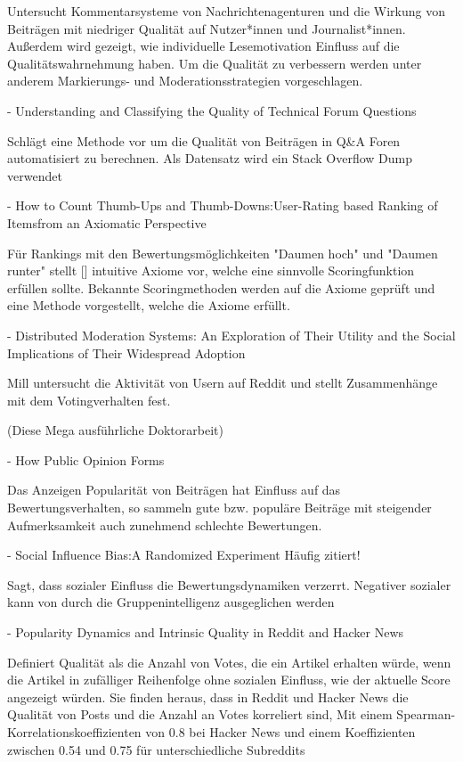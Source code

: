 Untersucht Kommentarsysteme von Nachrichtenagenturen und die Wirkung von Beiträgen mit niedriger Qualität auf Nutzer*innen und Journalist*innen. Außerdem wird gezeigt, wie individuelle Lesemotivation Einfluss auf die Qualitätswahrnehmung haben. Um die Qualität zu verbessern werden unter anderem Markierungs- und Moderationsstrategien vorgeschlagen.

- Understanding and Classifying the Quality of Technical Forum Questions

Schlägt eine Methode vor um die Qualität von Beiträgen in Q&A Foren automatisiert zu berechnen. Als Datensatz wird ein Stack Overflow Dump verwendet


- How to Count Thumb-Ups and Thumb-Downs:User-Rating based Ranking of Itemsfrom an Axiomatic Perspective

Für Rankings mit den Bewertungsmöglichkeiten "Daumen hoch" und "Daumen runter" stellt [] intuitive Axiome vor, welche eine sinnvolle Scoringfunktion  erfüllen sollte. Bekannte Scoringmethoden werden auf die Axiome geprüft und eine Methode vorgestellt, welche die Axiome erfüllt.

- Distributed Moderation Systems: An Exploration of Their Utility and the Social Implications of Their Widespread Adoption

Mill untersucht die Aktivität von Usern auf Reddit und stellt Zusammenhänge mit dem Votingverhalten fest.

(Diese Mega ausführliche Doktorarbeit)

- How Public Opinion Forms

Das Anzeigen Popularität von Beiträgen hat Einfluss auf das Bewertungsverhalten, so sammeln gute bzw. populäre Beiträge mit steigender Aufmerksamkeit auch zunehmend schlechte Bewertungen.

- Social Influence Bias:A Randomized Experiment Häufig zitiert!

Sagt, dass sozialer Einfluss die Bewertungsdynamiken verzerrt. Negativer sozialer kann von durch die Gruppenintelligenz ausgeglichen werden


- Popularity Dynamics and Intrinsic
Quality in Reddit and Hacker News


Definiert Qualität als die Anzahl von Votes, die ein Artikel erhalten würde, wenn die Artikel in zufälliger Reihenfolge ohne sozialen Einfluss, wie der aktuelle Score angezeigt würden. Sie finden heraus, dass in Reddit und Hacker News die Qualität von Posts und die Anzahl an Votes korreliert sind, Mit einem Spearman-Korrelationskoeffizienten von 0.8 bei Hacker News und einem Koeffizienten zwischen 0.54 und 0.75 für unterschiedliche Subreddits

